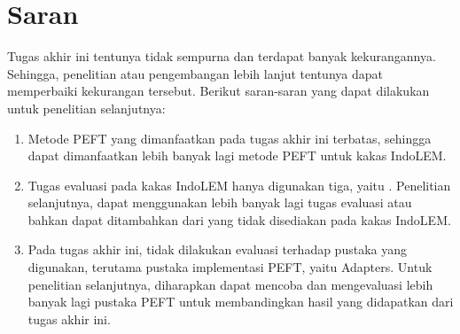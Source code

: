 \section{Saran}

Tugas akhir ini tentunya tidak sempurna dan terdapat banyak kekurangannya. Sehingga, penelitian atau pengembangan lebih lanjut tentunya dapat memperbaiki kekurangan tersebut. Berikut saran-saran yang dapat dilakukan untuk penelitian selanjutnya:
\begin{enumerate}
    \item{
        Metode PEFT yang dimanfaatkan pada tugas akhir ini terbatas, sehingga dapat dimanfaatkan lebih banyak lagi metode PEFT untuk kakas IndoLEM.
    }
    \item {
        Tugas evaluasi pada kakas IndoLEM hanya digunakan tiga, yaitu \nlptask. Penelitian selanjutnya, dapat menggunakan lebih banyak lagi tugas evaluasi atau bahkan dapat ditambahkan dari yang tidak disediakan pada kakas IndoLEM.
    }
    \item {
        Pada tugas akhir ini, tidak dilakukan evaluasi terhadap pustaka yang digunakan, terutama pustaka implementasi PEFT, yaitu Adapters. Untuk penelitian selanjutnya, diharapkan dapat mencoba dan mengevaluasi lebih banyak lagi pustaka PEFT untuk membandingkan hasil yang didapatkan dari tugas akhir ini.
    }
\end{enumerate}
